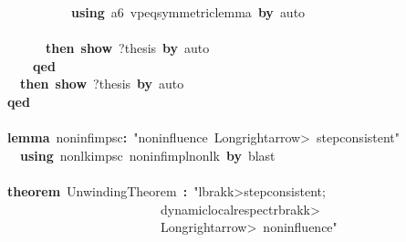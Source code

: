 \documentclass{article}
\newcommand{\syntaxKEYWORDA}[1]{\textcolor[rgb]{0.0,0.4,0.6}{\textbf{#1}}}
\newcommand{\syntaxKEYWORDC}[1]{\textcolor[rgb]{0.0,0.6,1.0}{\textbf{#1}}}
\newcommand{\syntaxLITERALA}[1]{\textcolor[rgb]{1.0,0.0,0.8}{#1}}
\newcommand{\syntaxOPERATOR}[1]{\textcolor[rgb]{0.0,0.0,0.0}{\textbf{#1}}}
\newcommand{\syntaxKEYWORDA}[1]{\textcolor[rgb]{0.0,0.4,0.6}{\textbf{#1}}}
\newcommand{\syntaxKEYWORDC}[1]{\textcolor[rgb]{0.0,0.6,1.0}{\textbf{#1}}}
\newcommand{\syntaxLITERALA}[1]{\textcolor[rgb]{1.0,0.0,0.8}{#1}}
\newcommand{\syntaxOPERATOR}[1]{\textcolor[rgb]{0.0,0.0,0.0}{\textbf{#1}}}
\newcommand{\syntaxKEYWORDA}[1]{\textcolor[rgb]{0.0,0.4,0.6}{\textbf{#1}}}
\newcommand{\syntaxKEYWORDC}[1]{\textcolor[rgb]{0.0,0.6,1.0}{\textbf{#1}}}
\newcommand{\syntaxLITERALA}[1]{\textcolor[rgb]{1.0,0.0,0.8}{#1}}
\newcommand{\syntaxOPERATOR}[1]{\textcolor[rgb]{0.0,0.0,0.0}{\textbf{#1}}}
\newcommand{\syntaxKEYWORDA}[1]{\textcolor[rgb]{0.0,0.4,0.6}{#1}}
\newcommand{\syntaxKEYWORDC}[1]{\textcolor[rgb]{0.0,0.6,1.0}{#1}}
\newcommand{\syntaxLITERALA}[1]{\textcolor[rgb]{1.0,0.0,0.8}{\textbf{#1}}}
\newcommand{\syntaxOPERATOR}[1]{\textcolor[rgb]{0.0,0.0,0.0}{#1}}
\newcommand{\syntaxKEYWORDA}[1]{\textcolor[rgb]{0.0,0.4,0.6}{\textbf{#1}}}
\newcommand{\syntaxKEYWORDC}[1]{\textcolor[rgb]{0.0,0.6,1.0}{\textbf{#1}}}
\newcommand{\syntaxLITERALA}[1]{\textcolor[rgb]{1.0,0.0,0.8}{#1}}
\newcommand{\syntaxOPERATOR}[1]{\textcolor[rgb]{0.0,0.0,0.0}{\textbf{#1}}}
\newcommand{\syntaxKEYWORDA}[1]{\textcolor[rgb]{0.0,0.4,0.6}{\textbf{#1}}}
\newcommand{\syntaxKEYWORDC}[1]{\textcolor[rgb]{0.0,0.6,1.0}{\textbf{#1}}}
\newcommand{\syntaxLITERALA}[1]{\textcolor[rgb]{1.0,0.0,0.8}{#1}}
\newcommand{\syntaxOPERATOR}[1]{\textcolor[rgb]{0.0,0.0,0.0}{\textbf{#1}}}
\begin{document}
{\ }{\ }{\ }{\ }{\ }{\ }{\ }{\ }{\ }{\ }{\ }{\ }{\ }{\ }\syntaxKEYWORDA{using}{\ }a6{\ }vpeq\usebox{\underscorebox}symmetric\usebox{\underscorebox}lemma{\ }\syntaxKEYWORDA{by}{\ }auto\hspace*{\fill}\\
{\ }{\ }{\ }{\ }{\ }{\ }{\ }{\ }{\ }{\ }{\ }{\ }\syntaxKEYWORDA{\usebox{\closecurlybracket}}\hspace*{\fill}\\
{\ }{\ }{\ }{\ }{\ }{\ }{\ }{\ }{\ }{\ }\syntaxKEYWORDA{then}{\ }\syntaxKEYWORDC{show}{\ }?thesis{\ }\syntaxKEYWORDA{by}{\ }auto\hspace*{\fill}\\
{\ }{\ }{\ }{\ }{\ }{\ }{\ }{\ }\syntaxKEYWORDA{qed}\hspace*{\fill}\\
{\ }{\ }{\ }{\ }{\ }{\ }\syntaxKEYWORDA{then}{\ }\syntaxKEYWORDC{show}{\ }?thesis{\ }\syntaxKEYWORDA{by}{\ }auto\hspace*{\fill}\\
{\ }{\ }{\ }{\ }\syntaxKEYWORDA{qed}\hspace*{\fill}\\
\hspace*{\fill}\\
{\ }{\ }{\ }{\ }\syntaxKEYWORDA{lemma}{\ }noninf\usebox{\underscorebox}imp\usebox{\underscorebox}sc\syntaxOPERATOR{:}{\ }\syntaxLITERALA{"noninfluence{\ }\<Longrightarrow>{\ }step\usebox{\underscorebox}consistent"}\hspace*{\fill}\\
{\ }{\ }{\ }{\ }{\ }{\ }\syntaxKEYWORDA{using}{\ }nonlk\usebox{\underscorebox}imp\usebox{\underscorebox}sc{\ }noninf\usebox{\underscorebox}impl\usebox{\underscorebox}nonlk{\ }\syntaxKEYWORDA{by}{\ }blast{\ }{\ }\hspace*{\fill}\\
\hspace*{\fill}\\
{\ }{\ }{\ }{\ }\syntaxKEYWORDA{theorem}{\ }UnwindingTheorem{\ }\syntaxOPERATOR{:}{\ }\syntaxLITERALA{"\<lbrakk>step\usebox{\underscorebox}consistent;}\hspace*{\fill}\\
\syntaxLITERALA{{\ }{\ }{\ }{\ }{\ }{\ }{\ }{\ }{\ }{\ }{\ }{\ }{\ }{\ }{\ }{\ }{\ }{\ }{\ }{\ }{\ }{\ }{\ }{\ }{\ }{\ }{\ }{\ }dynamic\usebox{\underscorebox}local\usebox{\underscorebox}respect\<rbrakk>{\ }}\hspace*{\fill}\\
\syntaxLITERALA{{\ }{\ }{\ }{\ }{\ }{\ }{\ }{\ }{\ }{\ }{\ }{\ }{\ }{\ }{\ }{\ }{\ }{\ }{\ }{\ }{\ }{\ }{\ }{\ }{\ }{\ }{\ }{\ }\<Longrightarrow>{\ }noninfluence"}\hspace*{\fill}\\
\end{document}
